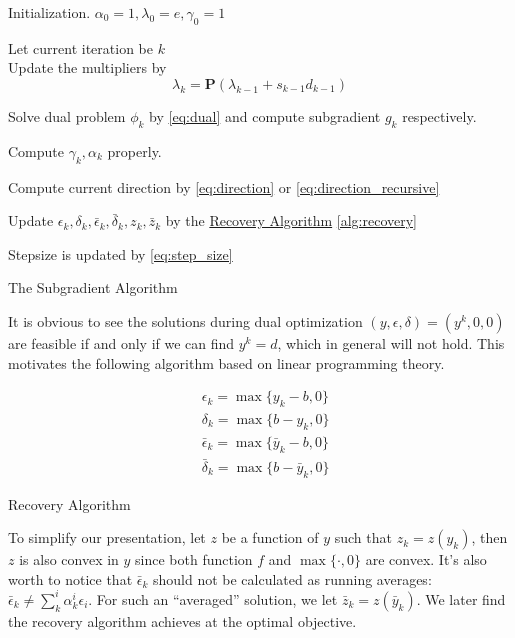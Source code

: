 \begin{algorithm}[H]
  \SetAlgoLined
  Initialization. \(\alpha_0 = 1, \lambda_0 = e, \gamma_0 = 1\)  \\
  {
    Let current iteration be \(k\)\\
    Update the multipliers by
    \[\lambda_{k} = \mathbf{P}(\lambda_{k-1} + s_{k-1}d_{k-1})\]

    Solve dual problem \(\phi_k\) by \eqref{eq:dual}
    and compute subgradient \(g_k\) respectively.

    Compute \(\gamma_k, \alpha_k\) properly.

    Compute current direction by \eqref{eq:direction} or \eqref{eq:direction_recursive}

    Update \(\epsilon_k,\delta_k ,\bar \epsilon_k ,\bar \delta_k, z_k, \bar z_k \)
    by the \underline{Recovery Algorithm} \ref{alg:recovery}

    Stepsize is updated by \eqref{eq:step_size}
  }
  \caption{The Subgradient Algorithm}
\end{algorithm}

It is obvious to see the solutions during dual optimization
\((y, \epsilon, \delta) = (y^k, 0, 0)\) are feasible if and only if we
can find \(y^k = d\), which in general will not hold. This motivates the following
algorithm based on linear programming theory.

\begin{algorithm}[H]\label{alg:recovery}
  \SetAlgoLined
  \begin{equation}\label{eq:recovery}
    \begin{aligned}
       & \epsilon_k = \max\{y_k - b, 0\}           \\
       & \delta_k = \max\{b - y_k, 0\}             \\
       & \bar \epsilon_k = \max\{\bar y_k - b, 0\} \\
       & \bar \delta_k = \max\{b - \bar y_k, 0\}
    \end{aligned}\end{equation}
  \caption{Recovery Algorithm}
\end{algorithm}

To simplify our presentation, let
\(z\) be a function of \(y\) such that \(z_k = z(y_k)\), then \(z\) is
also convex in \(y\) since both function \(f\) and \(\max\{\cdot, 0\}\)
are convex. It's also worth to notice that \(\bar \epsilon_k\) should
not be calculated as running averages:
\(\bar \epsilon_k \neq \sum^i_k \alpha^i_k \epsilon_i\). For such an
``averaged'' solution, we let
\(\bar z_k = z(\bar y_k)\). We later find the recovery algorithm achieves
at the optimal objective.


